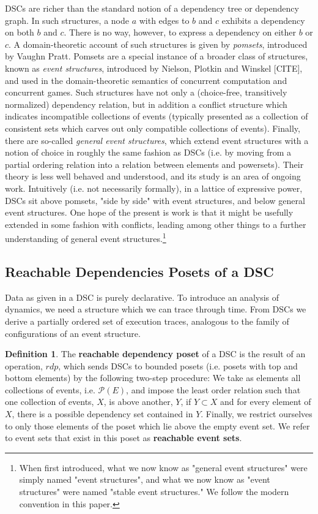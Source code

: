 \documentclass[hoptionsi,review,format=acmsmall]{acmart}
\theoremstyle{definition}
\newtheorem{definition}{Definition}[section]
\newcommand{\Pc}{\mathcal{P}}
\begin{document}
DSCs are richer than the standard notion of a dependency tree or dependency graph. In such structures, a node \(a\) with edges to \(b\) and \(c\) exhibits a dependency on both \(b\) and \(c\). There is no way, however, to express a dependency on either \(b\) or \(c\). A domain-theoretic account of such structures is given by \textit{pomsets}, introduced by Vaughn Pratt. Pomsets are a special instance of a broader class of structures, known as \textit{event structures}, introduced by Nielson, Plotkin and Winskel [CITE], and used in the domain-theoretic semantics of concurrent computation and concurrent games. Such structures have not only a (choice-free, transitively normalized) dependency relation, but in addition a conflict structure which indicates incompatible collections of events (typically presented as a collection of consistent sets which carves out only compatible collections of events). Finally, there are so-called \textit{general event structures}, which extend event structures with a notion of choice in roughly the same fashion as DSCs (i.e. by moving from a partial ordering relation into a relation between elements and powersets). Their theory is less well behaved and understood, and its study is an area of ongoing work. Intuitively (i.e. not necessarily formally), in a lattice of expressive power, DSCs sit above pomsets, "side by side" with event structures, and below general event structures.  One hope of the present is work is that it might be usefully extended in some fashion with conflicts, leading among other things to a further understanding of general event structures.\footnote{When first introduced, what we now know as "general event structures" were simply named "event structures", and what we now know as "event structures" were named "stable event structures." We follow the modern convention in this paper.}

\subsection{Reachable Dependencies Posets of a DSC}

Data as given in a DSC is purely declarative. To introduce an analysis of dynamics, we need a structure which we can trace through time. From DSCs we derive a partially ordered set of execution traces, analogous to the family of configurations of an event structure.

\begin{definition} The \textbf{reachable dependency poset} of a DSC is the result of an operation, \(rdp\), which sends DSCs to bounded posets (i.e. posets with top and bottom elements) by the following two-step procedure:  We take as elements all collections of events, i.e. \(\Pc(E)\), and impose the least order relation such that one collection of events, \(X\), is above another, \(Y\), if \(Y \subset X\) and for every element of \(X\), there is a possible dependency set contained in \(Y\).  Finally, we restrict ourselves to only those elements of the poset which lie above the empty event set. We refer to event sets that exist in this poset as \textbf{reachable event sets}.
\end{definition}
\end{document}
